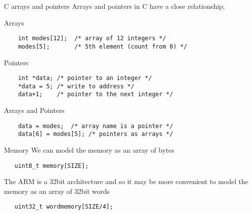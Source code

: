 \documentclass[xcolor=svgnames]{beamer}
\begin{document}
\begin{frame}[fragile]{C arrays and pointers}
Arrays and pointers in C have a close relationship;
\begin{exampleblock}{Arrays}
\begin{verbatim}
    int modes[12];  /* array of 12 integers */
    modes[5];       /* 5th element (count from 0) */
\end{verbatim}
\end{exampleblock}
\begin{exampleblock}{Pointers}
\begin{verbatim}
    int *data; /* pointer to an integer */
    *data = 5; /* write to address */
    data+1;    /* pointer to the next integer */
\end{verbatim}
\end{exampleblock}
\begin{exampleblock}{Arrays and Pointers}
\begin{verbatim}
    data = modes;  /* array name is a pointer */
    data[6] = modes[5]; /* pointers as arrays */
\end{verbatim}
\end{exampleblock}
\end{frame}

\begin{frame}[fragile]{Memory}
    We can model the memory as an array of bytes
    \begin{tcolorbox}
        \begin{verbatim}
   uint8_t memory[SIZE];
        \end{verbatim}
    \end{tcolorbox}
    The ARM is a 32bit architecture and so it may be more
    convenient to model the memory as an array of 32bit words
    \begin{tcolorbox}
        \begin{verbatim}
   uint32_t wordmemory[SIZE/4];
        \end{verbatim}
    \end{tcolorbox}

\end{frame}
\end{document}
